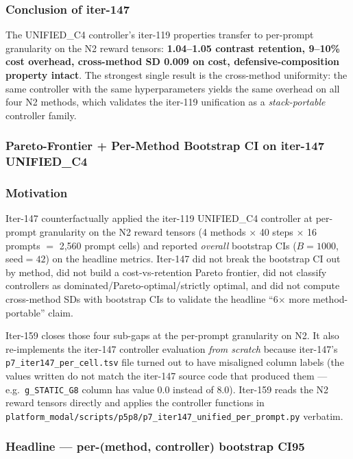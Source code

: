 \documentclass{article}
\begin{document}
\subsubsection*{Conclusion of iter-147}

The UNIFIED\_C4 controller's iter-119 properties transfer to per-prompt
granularity on the N2 reward tensors:
\textbf{1.04--1.05 contrast retention, 9--10\% cost overhead, cross-method
SD 0.009 on cost, defensive-composition property intact}.
The strongest single result is the cross-method uniformity: the same
controller with the same hyperparameters yields the same overhead on all
four N2 methods, which validates the iter-119 unification as a
\emph{stack-portable} controller family.
 

\subsubsection*{Pareto-Frontier + Per-Method Bootstrap CI on iter-147 UNIFIED\_C4}
\label{sec:p7-iter159-pareto}

\subsubsection*{Motivation}

Iter-147 counterfactually applied the iter-119 UNIFIED\_C4 controller at per-prompt
granularity on the N2 reward tensors (4 methods $\times$ 40 steps $\times$ 16 prompts $=$
2,560 prompt cells) and reported \emph{overall} bootstrap CIs
($B=1000$, seed$=42$) on the headline metrics. Iter-147 did not break the
bootstrap CI out by method, did not build a cost-vs-retention Pareto
frontier, did not classify controllers as dominated/Pareto-optimal/strictly
optimal, and did not compute cross-method SDs with bootstrap CIs to
validate the headline ``6$\times$ more method-portable'' claim.

Iter-159 closes those four sub-gaps at the per-prompt granularity on N2.
It also re-implements the iter-147 controller evaluation \emph{from scratch}
because iter-147's \texttt{p7\_iter147\_per\_cell.tsv} file turned out to
have misaligned column labels (the values written do not match the iter-147
source code that produced them --- e.g.\ \texttt{g\_STATIC\_G8} column has
value $0.0$ instead of $8.0$). Iter-159 reads the N2 reward tensors
directly and applies the controller functions in
\texttt{platform_modal/scripts/p5p8/p7\_iter147\_unified\_per\_prompt.py} verbatim.

\subsubsection*{Headline --- per-(method, controller) bootstrap CI95}
\end{document}

